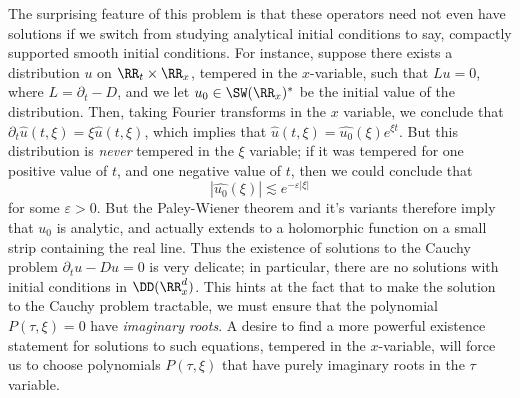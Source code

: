 The surprising feature of this problem is that these operators need not even have solutions if we switch from studying analytical initial conditions to say, compactly supported smooth initial conditions. For instance, suppose there exists a distribution $u$ on $\RR_t \times \RR_x$, tempered in the $x$-variable, such that $Lu = 0$, where $L = \partial_t - D$, and we let $u_0 \in \SW(\RR_x)^*$ be the initial value of the distribution. Then, taking Fourier transforms in the $x$ variable, we conclude that $\partial_t \widehat{u}(t,\xi) = \xi \widehat{u}(t,\xi)$, which implies that $\widehat{u}(t,\xi) = \widehat{u_0}(\xi) e^{\xi t}$. But this distribution is \emph{never} tempered in the $\xi$ variable; if it was tempered for one positive value of $t$, and one negative value of $t$, then we could conclude that
%
\[ |\widehat{u_0}(\xi)| \lesssim e^{- \varepsilon |\xi|} \]
%
for some $\varepsilon > 0$. But the Paley-Wiener theorem and it's variants therefore imply that $u_0$ is analytic, and actually extends to a holomorphic function on a small strip containing the real line. Thus the existence of solutions to the Cauchy problem $\partial_t u - Du = 0$ is very delicate; in particular, there are no solutions with initial conditions in $\DD(\RR^d_x)$. This hints at the fact that to make the solution to the Cauchy problem tractable, we must ensure that the polynomial $P(\tau,\xi) = 0$ have \emph{imaginary roots}. A desire to find a more powerful existence statement for solutions to such equations, tempered in the $x$-variable, will force us to choose polynomials $P(\tau,\xi)$ that have purely imaginary roots in the $\tau$ variable.

%
%
%
%

